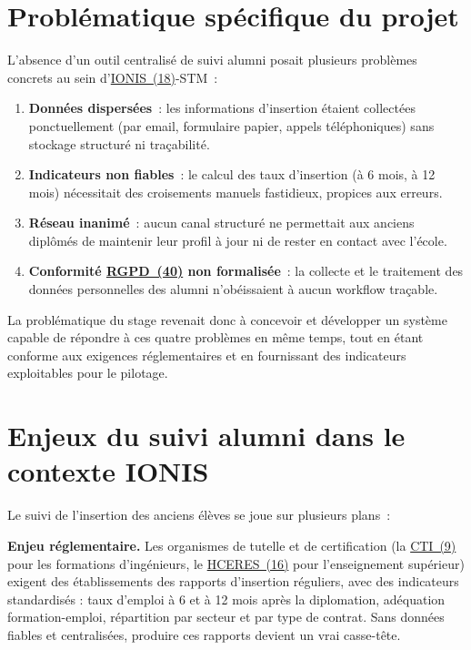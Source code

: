 \documentclass[12pt,a4paper]{report}
\begin{document}
\section{Problématique spécifique du projet}

L'absence d'un outil centralisé de suivi alumni posait plusieurs problèmes concrets au sein d'\hyperlink{abbr-IONIS}{IONIS~(18)}-STM~:

\begin{enumerate}
  \item \textbf{Données dispersées}~: les informations d'insertion étaient collectées ponctuellement (par email, formulaire papier, appels téléphoniques) sans stockage structuré ni traçabilité.
  \item \textbf{Indicateurs non fiables}~: le calcul des taux d'insertion (à 6 mois, à 12 mois) nécessitait des croisements manuels fastidieux, propices aux erreurs.
  \item \textbf{Réseau inanimé}~: aucun canal structuré ne permettait aux anciens diplômés de maintenir leur profil à jour ni de rester en contact avec l'école.
  \item \textbf{Conformité \hyperlink{abbr-RGPD}{RGPD~(40)} non formalisée}~: la collecte et le traitement des données personnelles des alumni n'obéissaient à aucun workflow traçable.
\end{enumerate}

La problématique du stage revenait donc à concevoir et développer un système capable de répondre à ces quatre problèmes en même temps, tout en étant conforme aux exigences réglementaires et en fournissant des indicateurs exploitables pour le pilotage.

\section{Enjeux du suivi alumni dans le contexte IONIS}

Le suivi de l'insertion des anciens élèves se joue sur plusieurs plans~:

\textbf{Enjeu réglementaire.} Les organismes de tutelle et de certification (la \hyperlink{abbr-CTI}{CTI~(9)} pour les formations d'ingénieurs, le \hyperlink{abbr-HCERES}{HCERES~(16)} pour l'enseignement supérieur) exigent des établissements des rapports d'insertion réguliers, avec des indicateurs standardisés : taux d'emploi à 6 et à 12 mois après la diplomation, adéquation formation-emploi, répartition par secteur et par type de contrat. Sans données fiables et centralisées, produire ces rapports devient un vrai casse-tête.
\end{document}
